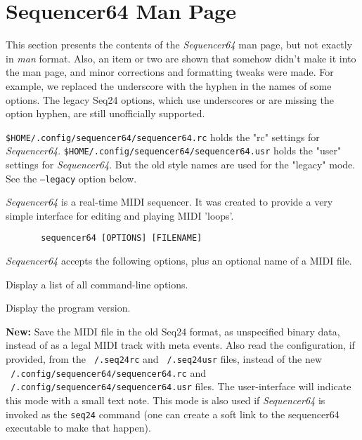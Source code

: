 %
%
%

\section{Sequencer64 Man Page}
\label{sec:seq64_man_page}

   This section presents the contents of the \textsl{Sequencer64} man page, but
   not exactly in \textsl{man} format.  Also, an item or two are shown that
   somehow didn't make it into the man page, and minor corrections and
   formatting tweaks were made.
   For example, we replaced the underscore with the hyphen in the names of some
   options.  The legacy Seq24 options, which use underscores or are missing the
   option hyphen, are still unofficially supported.

   \texttt{\$HOME/.config/sequencer64/sequencer64.rc} holds the "rc" settings
   for \textsl{Sequencer64}.
   \texttt{\$HOME/.config/sequencer64/sequencer64.usr} holds the "user" settings
   for \textsl{Sequencer64}.
   But the old style names are used for the "legacy" mode.  See the
   \texttt{--legacy} option below.

   \textsl{Sequencer64} is a real-time MIDI sequencer. It was created to
   provide a very simple interface for editing and playing MIDI 'loops'.

   \begin{verbatim}
       sequencer64 [OPTIONS] [FILENAME]
   \end{verbatim}

   \textsl{Sequencer64} accepts the following options, plus an optional name of
   a MIDI file.

   \setcounter{ItemCounter}{0}      %

      Display a list of all command-line options.

      Display the program version.

      \textbf{New:}
      Save the MIDI file in the old Seq24 format, as unspecified
      binary data, instead of as a legal MIDI track with meta events.
      Also read the configuration, if provided, from the
      \texttt{~/.seq24rc} and \texttt{~/.seq24usr} files,
      instead of the new
      \texttt{~/.config/sequencer64/sequencer64.rc} and
      \texttt{~/.config/sequencer64/sequencer64.usr} files.
      The user-interface will indicate this mode with a small text
      note.
      This mode is also used if \textsl{Sequencer64} is invoked as the
      \texttt{seq24} command (one can create a soft link to the sequencer64
      executable to make that happen).

